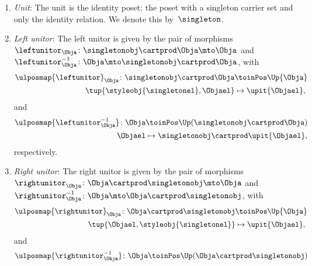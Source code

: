 \begin{lemma}
\begin{enumerate}
		\item \emph{Unit}: The unit is the identity poset: the poset with a singleton carrier set and only the identity relation.
		      We denote this by~$\singleton$.
		\item \emph{Left unitor}: The left unitor is given by the pair of morphisms~$\leftunitor_\Obja\colon \singletonobj\cartprod \Obja \mto \Obja$ and~$\leftunitor_\Obja^{-1}\colon \Obja \mto \singletonobj\cartprod \Obja$, with
		      \begin{equation}
			      \begin{aligned}
				      \ulposmap{\leftunitor}_\Obja\colon \singletonobj\cartprod \Obja & \toinPos \Up{\Obja}       \\
				      \tup{\styleobj{\singletonel},\Objael}                           & \mapsto \upit\{\Objael\},
			      \end{aligned}
		      \end{equation}
		      and
		      \begin{equation}
			      \begin{aligned}
				      \ulposmap{\leftunitor_{\Obja}^{-1}}\colon \Obja & \toinPos \Up(\singletonobj\cartprod \Obja)         \\
				      \Objael                                         & \mapsto \singletonobj \cartprod \upit \{\Objael\},
			      \end{aligned}
		      \end{equation}
		      respectively.
		\item \emph{Right unitor}: The right unitor is given by the pair of morphisms~$\rightunitor_\Obja\colon \Obja\cartprod \singletonobj  \mto \Obja$ and~$\rightunitor_\Obja^{-1}\colon \Obja \mto \Obja \cartprod \singletonobj$, with
		      \begin{equation}
			      \begin{aligned}
				      \ulposmap{\rightunitor}_\Obja\colon \Obja\cartprod \singletonobj & \toinPos \Up{\Obja}       \\
				      \tup{\Objael,\styleobj{\singletonel}}                            & \mapsto \upit\{\Objael\},
			      \end{aligned}
		      \end{equation}
		      and
		      \begin{equation}
			      \begin{aligned}
				      \ulposmap{\rightunitor_{\Obja}^{-1}}\colon \Obja & \toinPos \Up( \Obja \cartprod \singletonobj)       \\

\end{aligned}
\end{equation}
\end{enumerate}
\end{lemma}
